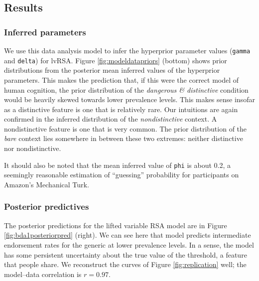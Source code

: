\documentclass[10pt,letterpaper]{article}
\begin{document}

\subsection{Results}

\subsubsection{Inferred parameters}
We use this data analysis model to infer the hyperprior parameter values (\lstinline{gamma} and \lstinline{delta}) for lvRSA. Figure \ref{fig:modeldatapriors} (bottom) shows prior distributions from the posterior mean inferred values of the hyperprior parameters. This makes the prediction that, if this were the correct model of human cognition, the prior distribution of the \emph{dangerous \& distinctive} condition would be heavily skewed towards lower prevalence levels. This makes sense insofar as a distinctive feature is one that is relatively rare. Our intuitions are again confirmed in the inferred distribution of the \emph{nondistinctive} context. A nondistinctive feature is one that is very common. The prior distribution of the \emph{bare} context lies somewhere in between these two extremes: neither distinctive nor nondistinctive.

It should also be noted that the mean inferred value of  \lstinline{phi} is about 0.2, a seemingly reasonable estimation of ``guessing'' probability for participants on Amazon's Mechanical Turk.

\subsubsection{Posterior predictives}
The posterior predictions for the lifted variable RSA model are in Figure \ref{fig:bda1posteriorpred} (right). We can see here that model predicts intermediate endorsement rates for the generic at lower prevalence levels. In a sense, the model has some persistent uncertainty about the true value of the threshold, a feature that people share. We reconstruct the curves of Figure \ref{fig:replication} well; the model--data correlation is $r = 0.97$.



\end{document}
